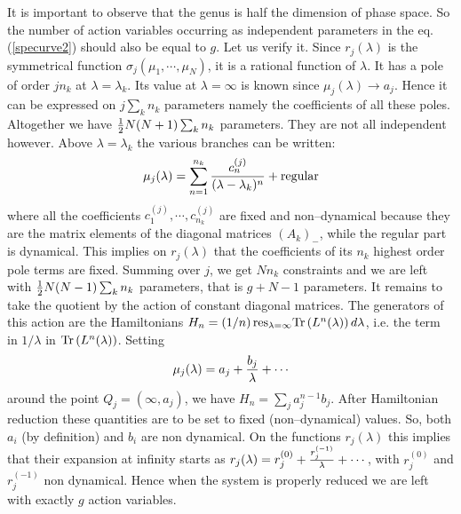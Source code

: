 \documentclass[a4paper,11pt]{article}
\begin{document}
It is important to observe that the
genus is  half the dimension of phase space.
So  the number of action variables occurring as
independent parameters in the eq.(\ref{specurve2}) should also
be equal to $g$.  Let us verify it. 
Since $r_j(\lambda)$ is the symmetrical function
$\sigma_j(\mu_1,\cdots,\mu_N)$, 
it is a  rational function of $\lambda $.
It has a pole of order $jn_k$ at
$\lambda =\lambda _k$.
Its value at $\lambda = \infty$ is known since
$\mu_j(\lambda)\to a_j$. Hence it can be expressed on $j\sum_k n_k$ 
parameters
namely the coefficients of all these poles.  Altogether we have
${1\over 2} N(N+1) \sum_k n_k$ parameters. They are not all independent
however. Above $\lambda =\lambda _k$ the various branches can be written:
\begin{equation}
\mu_j(\lambda)=\sum_{n=1}^{n_k} {c^{(j)}_n\over (\lambda -\lambda _k)^n}+{\rm
regular}
\label{cont1}
\end{equation} 
where all the coefficients $c^{(j)}_1,\cdots,c^{(j)}_{n_k}$
are fixed and non--dynamical because they are the matrix elements of
the diagonal matrices $(A_k)_-$, while the regular part is
dynamical. This implies on $r_j(\lambda)$ that the coefficients of its $n_k$ highest 
order pole terms  are fixed. Summing over $j$, we get
$Nn_k$ constraints and we are left with ${1\over 2} N(N-1) \sum_k n_k$ 
parameters, that is $g+N-1$ parameters.
It remains to take the quotient by the action of constant diagonal matrices.
The generators of this action are the Hamiltonians 
$H_n=(1/n)\,{\rm res}_{\lambda =\infty}{\rm Tr}
\,(L^n(\lambda ))\, d\lambda $,
i.e. the term in $1/\lambda $ in ${\rm Tr}\,(L^n(\lambda ))$. 
Setting 
\begin{equation}
\mu_j(\lambda) = a_j + {b_j \over \lambda} + \cdots 
\label{cont2}
\end{equation} 
around the point $Q_j = (\infty,a_j)$, we have $H_n = \sum_j a_j^{n-1} b_j $.
After Hamiltonian reduction these quantities are to be set to fixed
(non--dynamical) values. So, both $a_i$ (by definition) and $b_i$ are non dynamical. 
On the functions  $r_j(\lambda )$ this implies that their expansion at infinity 
starts as $r_j(\lambda ) = r_j^{(0)}+{ r_j^{(-1)}\over \lambda } + \cdots$,
with $r_j^{(0)}$ and $r_j^{(-1)}$ non dynamical.
Hence when the system is properly reduced we
are left with exactly $g$ action variables. 
\end{document}
